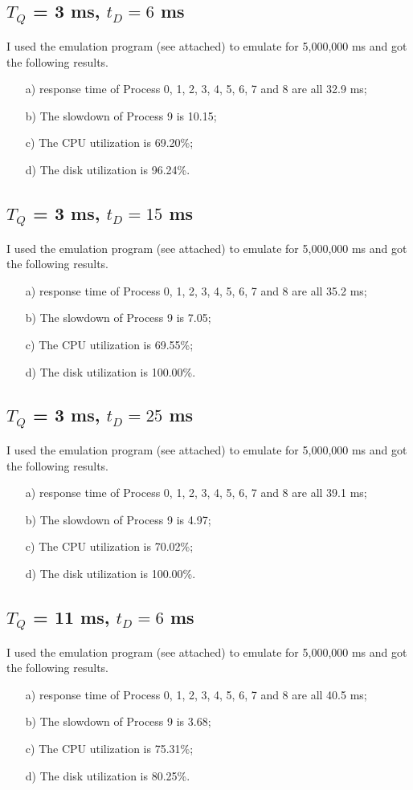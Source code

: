 \documentclass[12pt,letterpaper]{article}
\begin{document}
\subsection{$T_Q$ = 3 ms, $t_D=6$ ms}
I used the emulation program (see attached) to emulate for 5,000,000 ms and got the following results.
\begin{enumerate}
\item[a)] response time of Process 0, 1, 2, 3, 4, 5, 6, 7 and 8 are all 32.9 ms;
\item[b)] The slowdown of Process 9 is 10.15;
\item[c)] The CPU utilization is 69.20\%;
\item[d)] The disk utilization is 96.24\%.
\end{enumerate}

\subsection{$T_Q$ = 3 ms, $t_D=15$ ms}
I used the emulation program (see attached) to emulate for 5,000,000 ms and got the following results.
\begin{enumerate}
\item[a)] response time of Process 0, 1, 2, 3, 4, 5, 6, 7 and 8 are all 35.2 ms;
\item[b)] The slowdown of Process 9 is 7.05;
\item[c)] The CPU utilization is 69.55\%;
\item[d)] The disk utilization is 100.00\%.
\end{enumerate}

\subsection{$T_Q$ = 3 ms, $t_D=25$ ms}
I used the emulation program (see attached) to emulate for 5,000,000 ms and got the following results.
\begin{enumerate}
\item[a)] response time of Process 0, 1, 2, 3, 4, 5, 6, 7 and 8 are all 39.1 ms;
\item[b)] The slowdown of Process 9 is 4.97;
\item[c)] The CPU utilization is 70.02\%;
\item[d)] The disk utilization is 100.00\%.
\end{enumerate}

\subsection{$T_Q$ = 11 ms, $t_D=6$ ms}
I used the emulation program (see attached) to emulate for 5,000,000 ms and got the following results.
\begin{enumerate}
\item[a)] response time of Process 0, 1, 2, 3, 4, 5, 6, 7 and 8 are all 40.5 ms;
\item[b)] The slowdown of Process 9 is 3.68;
\item[c)] The CPU utilization is 75.31\%;
\item[d)] The disk utilization is 80.25\%.
\end{enumerate}
\end{document}
